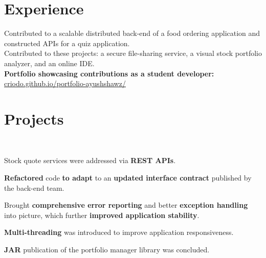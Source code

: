 \documentclass[]{deedy-resume-openfont}
\begin{document}
\begin{minipage}[t]{0.66\textwidth} 


\section{Experience}


Contributed to a scalable distributed back-end of a food ordering application and constructed APIs for a quiz application.\\

Contributed to these projects: a secure file-sharing service, a visual stock portfolio analyzer, and an online IDE.\\

\textbf{Portfolio showcasing contributions as a student developer:} \href{https://criodo.github.io/portfolio-ayushshawz/}{criodo.github.io/portfolio-ayushshawz/}\\


\section{Projects}

\\
\sectionsep
\begin{tightemize}
\item Stock quote services were addressed via \textbf{REST APIs}.
\item \textbf{Refactored} code \textbf{to adapt} to an \textbf{updated interface contract} published by the back-end team.
\item Brought \textbf{comprehensive error reporting} and better \textbf{exception handling} into picture, which further \textbf{improved application stability}.
\item \textbf{Multi-threading} was introduced to improve application responsiveness.
\item \textbf{JAR} publication of the portfolio manager library was concluded.
\end{tightemize}
\sectionsep


\end{minipage}
\end{document}
